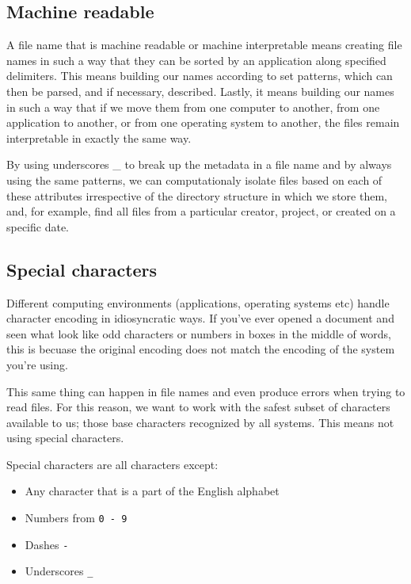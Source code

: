 \documentclass[
]{book}
\providecommand{\tightlist}{%
  \setlength{\itemsep}{0pt}\setlength{\parskip}{0pt}}
\begin{document}
\hypertarget{machine-readable-1}{%
\subsection*{Machine readable}\label{machine-readable-1}}

A file name that is machine readable or machine interpretable means creating file names in such a way that they can be sorted by an application along specified delimiters. This means building our names according to set patterns, which can then be parsed, and if necessary, described. Lastly, it means building our names in such a way that if we move them from one computer to another, from one application to another, or from one operating system to another, the files remain interpretable in exactly the same way.

By using underscores \_ to break up the metadata in a file name and by always using the same patterns, we can computationaly isolate files based on each of these attributes irrespective of the directory structure in which we store them, and, for example, find all files from a particular creator, project, or created on a specific date.

\hypertarget{special-characters-1}{%
\subsection*{Special characters}\label{special-characters-1}}

Different computing environments (applications, operating systems etc) handle character encoding in idiosyncratic ways. If you've ever opened a document and seen what look like odd characters or numbers in boxes in the middle of words, this is becuase the original encoding does not match the encoding of the system you're using.

This same thing can happen in file names and even produce errors when trying to read files. For this reason, we want to work with the safest subset of characters available to us; those base characters recognized by all systems. This means not using special characters.

Special characters are all characters except:

\begin{itemize}
\tightlist
\item
  Any character that is a part of the English alphabet
\item
  Numbers from \texttt{0\ -\ 9}
\item
  Dashes \texttt{-}
\item
  Underscores \texttt{\_}
\end{itemize}
\end{document}
